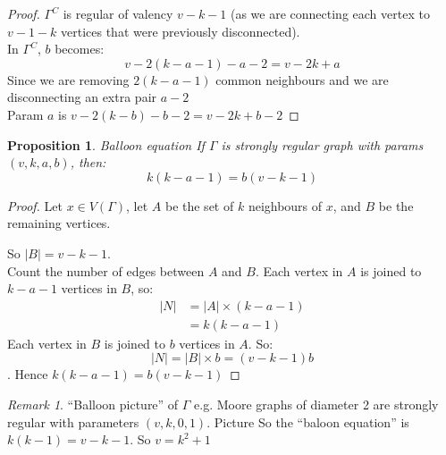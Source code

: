 \documentclass[]{article}
\newtheorem{prop}[thm]{Proposition}
\theoremstyle{definition}
\theoremstyle{remark}
\newtheorem*{rem}{Remark}
\numberwithin{equation}{section}
\begin{document}
		\begin{proof} $\Gamma^C$ is regular of valency $v-k-1$ (as we are connecting each vertex to $v-1-k$ vertices that were previously disconnected).\\

		In $\Gamma^C$, $b$ becomes:
		\[
			v - 2(k-a-1) -a- 2 = v-2k + a
		\]
		Since we are removing $2(k-a-1)$ common neighbours and we are disconnecting an extra pair $a-2$
		\\
		Param $a$ is $v-2(k-b)-b-2 = v -2k + b -2$
		\end{proof}
		\begin{prop}{Balloon equation}
		If $\Gamma$ is strongly regular graph with params $(v, k, a, b)$, then:
		\[k(k-a-1) = b(v-k-1)\]
		\end{prop}
		\begin{proof}
			Let $x \in V(\Gamma)$, let $A$ be the set of  $k$ neighbours of $x$, and $B$ be the remaining vertices.
			\begin{figure} %
			\end{figure}
			So $|B| = v - k -1$.\\
			Count the number of edges between $A$ and $B$. Each vertex in $A$ is joined to $k-a-1$ vertices in $B$, so:
			\begin{align*}
				|N| &= |A| \times (k-a-1)\\
					&= k(k-a-1)
			\end{align*}
			Each vertex in $B$ is joined to $b$ vertices in $A$. So:
			\[|N| = |B| \times b = (v-k-1)b\].
			Hence $k(k-a-1) = b(v-k-1)$
		\end{proof}
		\begin{rem}
		``Balloon picture'' of $\Gamma$
		e.g. Moore graphs of diameter 2 are strongly regular with parameters $(v, k, 0, 1)$. Picture %
		So the ``baloon equation'' is $k(k-1) = v-k-1$. So $v = k^2 +1$
		\end{rem}
\end{document}
